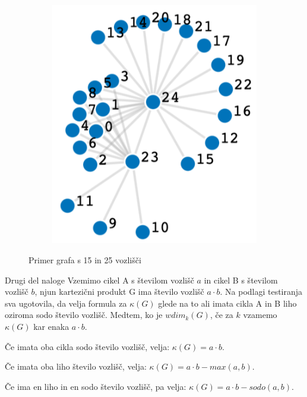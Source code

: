 \documentclass[12pt,a4paper]{amsart}
\makeatletter
\renewcommand\subsection{\@startsection{subsection}{2}%
  \z@{.5\linespacing\@plus.7\linespacing}{.5\linespacing}%
  {\normalfont\scshape}}
\theoremstyle{plain} %
\makeatother
\begin{document}
\begin{figure}[h]
\begin{subfigure}{0.25\textwidth}
    \includegraphics[width = \textwidth]{slike/graf25.png}
    \end{subfigure}
    \caption{Primer grafa s 15 in 25 vozlišči}
    \label{fig:slika2}
\end{figure}%


    
\subsection{Drugi del naloge}
Vzemimo cikel A s številom vozlišč $a$ in cikel B s številom vozlišč $b$, njun kartezični produkt G ima število vozlišč $a \cdot b$. 
Na podlagi testiranja sva ugotovila, da velja formula za $\kappa(G)$ glede na to ali imata cikla A in B liho oziroma sodo število vozlišč. 
Medtem, ko je $wdim_k(G)$, če za $k$ vzamemo $\kappa(G)$ kar enaka $a \cdot b$.

Če imata oba cikla sodo število vozlišč, velja: $\kappa(G) = a \cdot b$.

Če imata oba liho število vozlišč, velja: $\kappa(G) = a \cdot b - max(a,b)$.

Če ima en liho in en sodo število vozlišč, pa velja: $\kappa(G) = a \cdot b - sodo(a,b)$.
\end{document}
